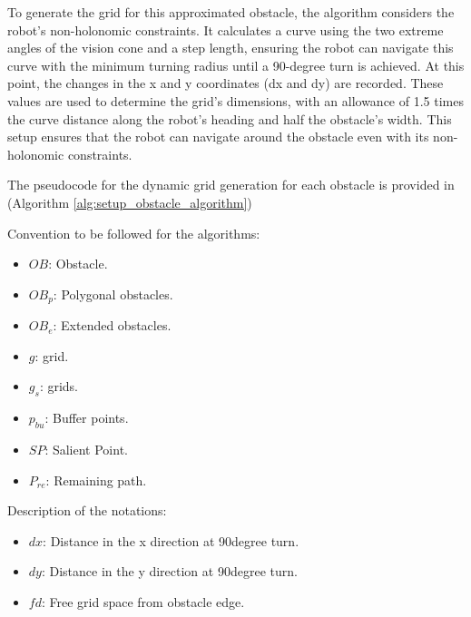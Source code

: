 \vspace*{6mm}  

To generate the grid for this approximated obstacle, the algorithm considers the robot's non-holonomic constraints. It calculates a curve using the two extreme angles of the vision cone and a step length, ensuring the robot can navigate this curve with the minimum turning radius until a 90-degree turn is achieved. At this point, the changes in the x and y coordinates (dx and dy) are recorded. These values are used to determine the grid's dimensions, with an allowance of 1.5 times the curve distance along the robot's heading and half the obstacle's width. This setup ensures that the robot can navigate around the obstacle even with its non-holonomic constraints.

\vspace*{6mm}  

The pseudocode for the dynamic grid generation for each obstacle is provided in (Algorithm \autoref{alg:setup_obstacle_algorithm})

\vspace*{6mm}  

Convention to be followed for the algorithms:
\begin{multicols}{2}
\begin{itemize}[noitemsep,topsep=0pt]
    \item $OB$: Obstacle.
    \item $OB_p$: Polygonal obstacles.
    \item $OB_e$: Extended obstacles.
    \item $g$: grid.
    \item $g_s$: grids.
    \item $p_{bu}$: Buffer points.
    \item $SP$: Salient Point.
    \item $P_{re}$: Remaining path.
\end{itemize}
\end{multicols}
    
\vspace*{6mm}  

Description of the notations:
\begin{itemize}[noitemsep,topsep=0pt]
    \item $dx$: Distance in the x direction at 90degree turn.
    \item $dy$: Distance in the y direction at 90degree turn.
    \item $fd$: Free grid space from obstacle edge.  
\end{itemize}

